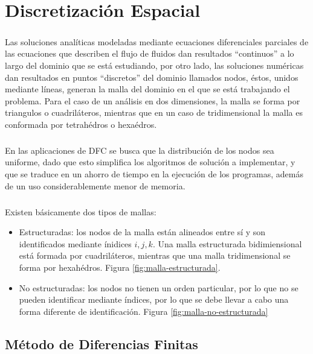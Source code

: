 \documentclass[letterpaper, openright, 12pt]{book}
\begin{document}
	\chapter{Discretización Espacial} \label{chap:discretizacion-espacial}
	\paragraph*{}
	Las soluciones analíticas modeladas mediante ecuaciones diferenciales parciales de las ecuaciones que describen el flujo de fluidos dan resultados ``continuos'' a lo largo del dominio que se está estudiando, por otro lado, las soluciones numéricas  dan resultados en puntos ``discretos'' del dominio llamados nodos, éstos, unidos mediante líneas, generan la malla del dominio en el que se está trabajando el problema. Para el caso de un análisis en dos dimensiones, la malla se forma por triangulos o cuadriláteros, mientras que en un caso de tridimensional la malla es conformada por tetrahédros o hexaédros. 
	
	\paragraph*{}
	En las aplicaciones de DFC se busca que la distribución de los nodos sea uniforme, dado que esto simplifica los algoritmos de solución a implementar,  y que se traduce en un ahorro de tiempo en la ejecución de los programas, además de un uso considerablemente menor de memoria.
	
	\paragraph*{}
	Existen básicamente dos tipos de mallas:
	\begin{itemize}
		\item Estructuradas: los nodos de la malla están alineados entre sí y son identificados mediante ínidices $i, j, k$. Una malla estructurada bidimiensional está formada por cuadriláteros, mientras que una malla tridimensional se forma por hexahédros. Figura \ref{fig:malla-estructurada}.
		\item No estructuradas: los nodos no tienen un orden particular, por lo que no se pueden identificar mediante índices, por lo que se debe llevar a cabo una forma diferente de identificación. Figura \ref{fig:malla-no-estructurada}
	\end{itemize}



    \section{Método de Diferencias Finitas}
\end{document}
